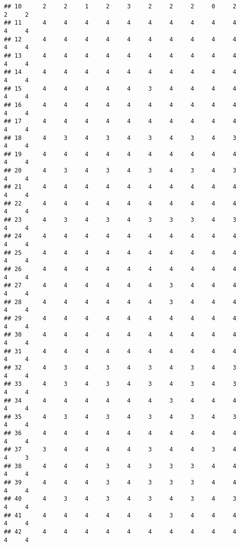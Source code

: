 \documentclass[
]{article}
\begin{document}
\begin{verbatim}
## 10      2     2     1     2     3     2     2     2     0     2     2     2
## 11      4     4     4     4     4     4     4     4     4     4     4     4
## 12      4     4     4     4     4     4     4     4     4     4     4     4
## 13      4     4     4     4     4     4     4     4     4     4     4     4
## 14      4     4     4     4     4     4     4     4     4     4     4     4
## 15      4     4     4     4     4     3     4     4     4     4     4     4
## 16      4     4     4     4     4     4     4     4     4     4     4     4
## 17      4     4     4     4     4     4     4     4     4     4     4     4
## 18      4     3     4     3     4     3     4     3     4     3     4     4
## 19      4     4     4     4     4     4     4     4     4     4     4     4
## 20      4     3     4     3     4     3     4     3     4     3     4     4
## 21      4     4     4     4     4     4     4     4     4     4     4     4
## 22      4     4     4     4     4     4     4     4     4     4     4     4
## 23      4     3     4     3     4     3     3     3     4     3     4     4
## 24      4     4     4     4     4     4     4     4     4     4     4     4
## 25      4     4     4     4     4     4     4     4     4     4     4     4
## 26      4     4     4     4     4     4     4     4     4     4     4     4
## 27      4     4     4     4     4     4     3     4     4     4     4     4
## 28      4     4     4     4     4     4     3     4     4     4     4     4
## 29      4     4     4     4     4     4     4     4     4     4     4     4
## 30      4     4     4     4     4     4     4     4     4     4     4     4
## 31      4     4     4     4     4     4     4     4     4     4     4     4
## 32      4     3     4     3     4     3     4     3     4     3     4     4
## 33      4     3     4     3     4     3     4     3     4     3     4     4
## 34      4     4     4     4     4     4     3     4     4     4     4     4
## 35      4     3     4     3     4     3     4     3     4     3     4     4
## 36      4     4     4     4     4     4     4     4     4     4     4     4
## 37      3     4     4     4     4     3     4     4     3     4     4     3
## 38      4     4     4     3     4     3     3     3     4     4     4     4
## 39      4     4     4     3     4     3     3     3     4     4     4     4
## 40      4     3     4     3     4     3     4     3     4     3     4     4
## 41      4     4     4     4     4     4     3     4     4     4     4     4
## 42      4     4     4     4     4     4     4     4     4     4     4     4

\end{verbatim}
\end{document}
